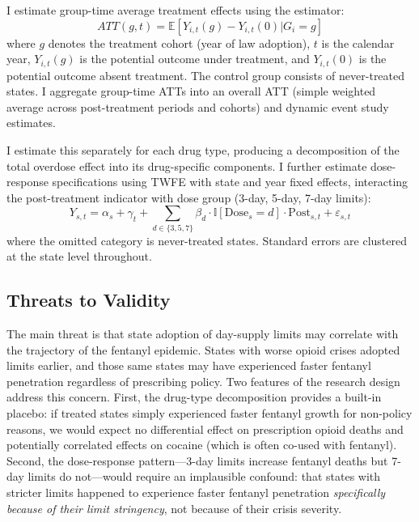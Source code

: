 \documentclass[12pt]{article}
\newcommand{\E}{\mathbb{E}}
\newcommand{\ind}{\mathbb{I}}
\begin{document}
I estimate group-time average treatment effects using the \citet{callaway2021difference} estimator:
\begin{equation}
ATT(g,t) = \E[Y_{i,t}(g) - Y_{i,t}(0) | G_i = g]
\end{equation}
where $g$ denotes the treatment cohort (year of law adoption), $t$ is the calendar year, $Y_{i,t}(g)$ is the potential outcome under treatment, and $Y_{i,t}(0)$ is the potential outcome absent treatment. The control group consists of never-treated states. I aggregate group-time ATTs into an overall ATT (simple weighted average across post-treatment periods and cohorts) and dynamic event study estimates.

I estimate this separately for each drug type, producing a decomposition of the total overdose effect into its drug-specific components. I further estimate dose-response specifications using TWFE with state and year fixed effects, interacting the post-treatment indicator with dose group (3-day, 5-day, 7-day limits):
\begin{equation}
Y_{s,t} = \alpha_s + \gamma_t + \sum_{d \in \{3,5,7\}} \beta_d \cdot \ind[\text{Dose}_s = d] \cdot \text{Post}_{s,t} + \varepsilon_{s,t}
\end{equation}
where the omitted category is never-treated states. Standard errors are clustered at the state level throughout.

\subsection{Threats to Validity}

The main threat is that state adoption of day-supply limits may correlate with the trajectory of the fentanyl epidemic. States with worse opioid crises adopted limits earlier, and those same states may have experienced faster fentanyl penetration regardless of prescribing policy. Two features of the research design address this concern. First, the drug-type decomposition provides a built-in placebo: if treated states simply experienced faster fentanyl growth for non-policy reasons, we would expect no differential effect on prescription opioid deaths and potentially correlated effects on cocaine (which is often co-used with fentanyl). Second, the dose-response pattern---3-day limits increase fentanyl deaths but 7-day limits do not---would require an implausible confound: that states with stricter limits happened to experience faster fentanyl penetration \textit{specifically because of their limit stringency}, not because of their crisis severity.
\end{document}
